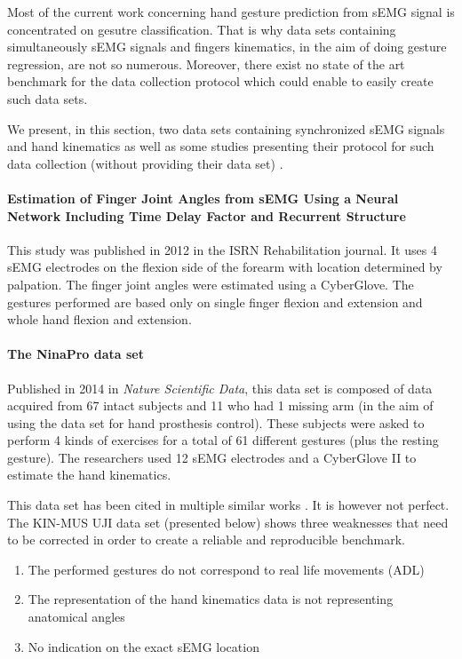 \documentclass{article}
\begin{document}
Most of the current work concerning hand gesture prediction from sEMG signal is concentrated on gesutre classification. That is why data sets containing simultaneously sEMG signals and fingers kinematics, in the aim of doing gesture regression, are not so numerous. Moreover, there exist no state of the art benchmark for the data collection protocol which could enable to easily create such data sets.
	
	
	We present, in this section, two data sets containing synchronized sEMG signals and hand kinematics \cite{ref:ninapro, ref:KinMusUji} as well as some studies presenting their protocol for such data collection (without providing their data set) \cite{ref:Ngeo2014, ref:Hioki2012}.
	
	
	\paragraph{Estimation of Finger Joint Angles from sEMG Using a Neural Network Including Time Delay Factor and Recurrent Structure \cite{ref:Hioki2012}}
	
	This study was published in 2012 in the ISRN Rehabilitation journal. It uses 4 sEMG electrodes on the flexion side of the forearm with location determined by palpation. The finger joint angles were estimated using a CyberGlove. The gestures performed are based only on single finger flexion and extension and whole hand flexion and extension.
	
	\paragraph{The NinaPro data set \cite{ref:ninapro}}
	
	Published in 2014 in \textit{Nature Scientific Data}, this data set is composed of data acquired from 67 intact subjects and 11 who had 1 missing arm (in the aim of using the data set for hand prosthesis control). These subjects were asked to perform 4 kinds of exercises for a total of 61 different gestures (plus the resting gesture). The researchers used 12 sEMG electrodes and a CyberGlove II to estimate the hand kinematics.
	
	This data set has been cited in multiple similar works \cite{ref:KinMusUji, ref:comp6EMGsetup}. It is however not perfect. The KIN-MUS UJI data set (presented below) shows three weaknesses that need to be corrected in order to create a reliable and reproducible benchmark.
	\begin{enumerate}
		\item The performed gestures do not correspond to real life movements (ADL)
		\item The representation of the hand kinematics data is not representing anatomical angles
		\item No indication on the exact sEMG location
	\end{enumerate}
	
\end{document}

